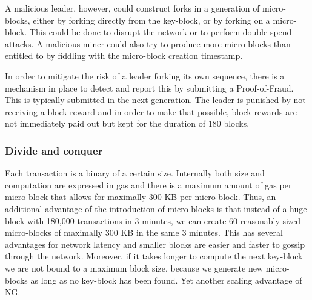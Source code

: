 A malicious leader, however, could construct forks in a generation of micro-blocks,
either by forking directly from the key-block, or by forking
on a micro-block. This could be done to disrupt the network or to
perform double spend attacks. A malicious miner could also try to
produce more micro-blocks than entitled to by fiddling with the
micro-block creation timestamp.

In order to mitigate the risk of a leader forking its own sequence,
there is a mechanism in place to detect and report this by submitting
a Proof-of-Fraud. This is typically submitted in the next
generation. The leader is punished by not receiving a block reward and
in order to make that possible, block rewards are not immediately paid out but kept for
the duration of 180 blocks.

\subsubsection{Divide and conquer}

Each transaction is a binary of a certain size. Internally both size
and computation are expressed in gas and there is a maximum amount of
gas per micro-block that allows for maximally 300 KB per micro-block.
Thus, an additional advantage of the introduction of micro-blocks is that
instead of a huge block with 180,000 transactions in 3 minutes, we can create 60
reasonably sized micro-blocks of maximally 300 KB in the same 3
minutes. This has several advantages for network latency and
smaller blocks are easier and faster to gossip through the
network. Moreover, if it takes longer to compute the next key-block we
are not bound to a maximum block size, because we generate new
micro-blocks as long as no key-block has been found. Yet another
scaling advantage of NG.
